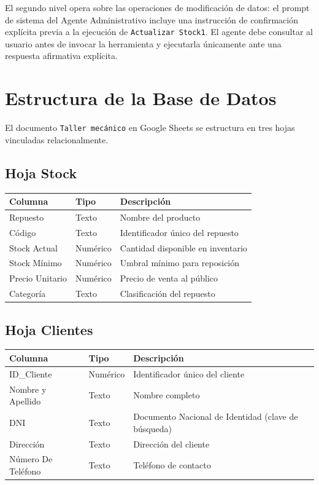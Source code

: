 \documentclass[12pt,a4paper]{report}
\begin{document}
El segundo nivel opera sobre las operaciones de modificación de datos: el prompt de sistema del Agente Administrativo incluye una instrucción de confirmación explícita previa a la ejecución de \texttt{Actualizar Stock1}. El agente debe consultar al usuario antes de invocar la herramienta y ejecutarla únicamente ante una respuesta afirmativa explícita.

\section{Estructura de la Base de Datos}
\label{sec:schema}

El documento \texttt{Taller mecánico} en Google Sheets se estructura en tres hojas vinculadas relacionalmente.

\subsection*{Hoja Stock}

\begin{tabular}{lll}
\toprule
Columna & Tipo & Descripción \\
\midrule
Repuesto & Texto & Nombre del producto \\
Código & Texto & Identificador único del repuesto \\
Stock Actual & Numérico & Cantidad disponible en inventario \\
Stock Mínimo & Numérico & Umbral mínimo para reposición \\
Precio Unitario & Numérico & Precio de venta al público \\
Categoría & Texto & Clasificación del repuesto \\
\bottomrule
\end{tabular}

\subsection*{Hoja Clientes}

\begin{tabular}{lll}
\toprule
Columna & Tipo & Descripción \\
\midrule
ID\_Cliente & Numérico & Identificador único del cliente \\
Nombre y Apellido & Texto & Nombre completo \\
DNI & Texto & Documento Nacional de Identidad (clave de búsqueda) \\
Dirección & Texto & Dirección del cliente \\
Número De Teléfono & Texto & Teléfono de contacto \\
\bottomrule
\end{tabular}
\end{document}
